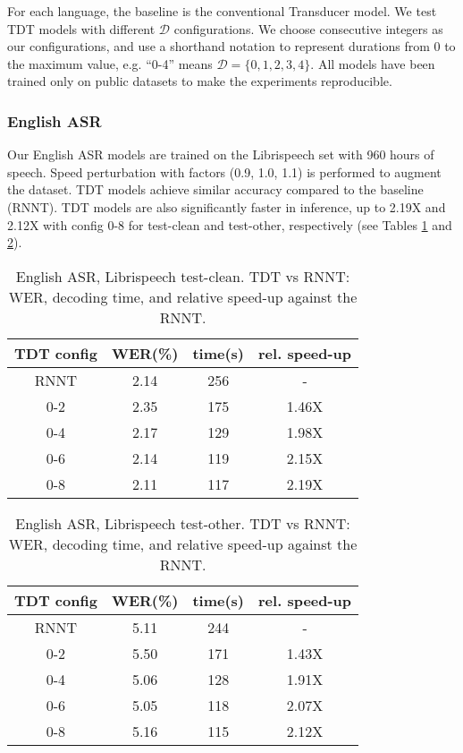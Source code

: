 \documentclass{article}
\begin{document}
For each language, the baseline is the conventional Transducer model. We test  TDT models with different $\mathcal{D}$ configurations. We choose consecutive integers as our configurations, and use a shorthand notation to represent durations from 0 to the maximum value, e.g. ``0-4'' means $\mathcal{D} = \{0,1,2,3,4\}$. All  models have been trained only on public datasets to make the experiments reproducible. 



\subsubsection{English ASR}
Our English ASR models are trained on the Librispeech \cite{panayotov2015librispeech} set with 960 hours of speech. Speed perturbation with factors (0.9, 1.0, 1.1) is performed to augment the dataset. TDT models achieve similar  accuracy compared to the baseline (RNNT). TDT models are also  significantly faster in inference, up to 2.19X and 2.12X with config 0-8 for test-clean and test-other, respectively (see Tables \ref{tab:librispeech_clean} and \ref{tab:librispeech}).

\begin{table}
    \centering
    \begin{tabular}{cccc}
    \toprule
         TDT config & WER(\%) & time(s) & rel. speed-up \\
    \midrule
    RNNT  & 2.14 & 256 & - \\
        0-2 & 2.35 & 175 & 1.46X \\
        0-4 & 2.17 & 129 & 1.98X \\
        0-6 & 2.14 & 119 & 2.15X \\
        0-8 & 2.11 & 117 & 2.19X \\
    \bottomrule
    \end{tabular}
    \caption{English ASR, Librispeech test-clean. TDT vs RNNT: WER, decoding time, and relative speed-up against the RNNT.
    }
    \label{tab:librispeech_clean}
\end{table}

\begin{table}
    \centering
    \begin{tabular}{cccc}
    \toprule
        TDT config & WER(\%) & time(s) & rel. speed-up \\
    \midrule
   RNNT & 5.11 & 244 & - \\
   \hline
        0-2 & 5.50 & 171 & 1.43X \\
        0-4 & 5.06 & 128 & 1.91X \\
        0-6 & 5.05 & 118 & 2.07X \\
        0-8 & 5.16 & 115 & 2.12X \\
    \bottomrule
    \end{tabular}
    \caption{English ASR, Librispeech test-other. TDT vs RNNT: WER, decoding time, and relative speed-up against the RNNT. 
}
    \label{tab:librispeech}
\end{table}
\end{document}

